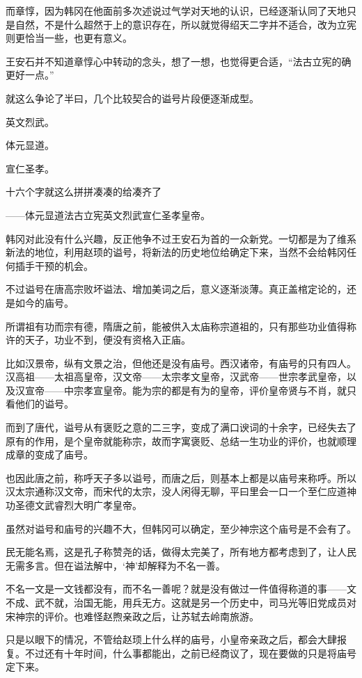 而章惇，因为韩冈在他面前多次述说过气学对天地的认识，已经逐渐认同了天地只是自然，不是什么超然于上的意识存在，所以就觉得绍天二字并不适合，改为立宪则更恰当一些，也更有意义。

王安石并不知道章惇心中转动的念头，想了一想，也觉得更合适，“法古立宪的确更好一点。”

就这么争论了半曰，几个比较契合的谥号片段便逐渐成型。

英文烈武。

体元显道。

宣仁圣孝。

十六个字就这么拼拼凑凑的给凑齐了

——体元显道法古立宪英文烈武宣仁圣孝皇帝。

韩冈对此没有什么兴趣，反正他争不过王安石为首的一众新党。一切都是为了维系新法的地位，利用赵顼的谥号，将新法的历史地位给确定下来，当然不会给韩冈任何插手干预的机会。

不过谥号在唐高宗败坏谥法、增加美词之后，意义逐渐淡薄。真正盖棺定论的，还是如今的庙号。

所谓祖有功而宗有德，隋唐之前，能被供入太庙称宗道祖的，只有那些功业值得称许的天子，功业不到，便没有资格入正庙。

比如汉景帝，纵有文景之治，但他还是没有庙号。西汉诸帝，有庙号的只有四人。汉高祖——太祖高皇帝，汉文帝——太宗孝文皇帝，汉武帝——世宗孝武皇帝，以及汉宣帝——中宗孝宣皇帝。能为宗的都是有为的皇帝，评价皇帝贤与不肖，就只看他们的谥号。

而到了唐代，谥号从有褒贬之意的二三字，变成了满口谀词的十余字，已经失去了原有的作用，是个皇帝就能称宗，故而字寓褒贬、总结一生功业的评价，也就顺理成章的变成了庙号。

也因此唐之前，称呼天子多以谥号，而唐之后，则基本上都是以庙号来称呼。所以汉太宗通称汉文帝，而宋代的太宗，没人闲得无聊，平曰里会一口一个至仁应道神功圣德文武睿烈大明广孝皇帝。

虽然对谥号和庙号的兴趣不大，但韩冈可以确定，至少神宗这个庙号是不会有了。

民无能名焉，这是孔子称赞尧的话，做得太完美了，所有地方都考虑到了，让人民无需多言。但在谥法解中，‘神’却解释为不名一善。

不名一文是一文钱都没有，而不名一善呢？就是没有做过一件值得称道的事——文不成、武不就，治国无能，用兵无方。这就是另一个历史中，司马光等旧党成员对宋神宗的评价。也难怪赵煦亲政之后，让苏轼去岭南旅游。

只是以眼下的情况，不管给赵顼上什么样的庙号，小皇帝亲政之后，都会大肆报复。不过还有十年时间，什么事都能出，之前已经商议了，现在要做的只是将庙号定下来。

